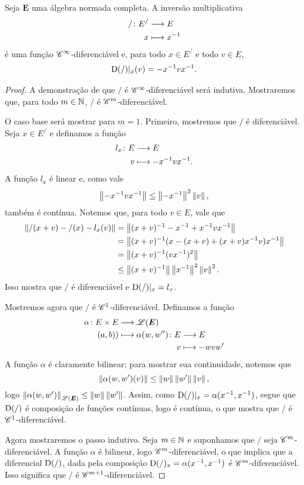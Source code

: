 \begin{proposition}
Seja $\bm E$ uma álgebra normada completa. A inversão multiplicativa
	\begin{align*}
	{/}\colon {E^{/}} &\longrightarrow {E} \\{x} &\longmapsto x^{-1}
	\end{align*}
é uma função $\mathscr{C}^\infty$-diferenciável e, para todo $x \in E^{/}$ e todo $v \in E$,
	\begin{align*}
	\mathrm{D}(/)|_x(v) = -x^{-1} v x^{-1}.
	\end{align*}
\end{proposition}
\begin{proof}
A demonstração de que $/$ é $\mathscr{C}^\infty$-diferenciável será indutiva. Mostraremos que, para todo $m \in \mathbb{N}$, $/$ é $\mathscr{C}^m$-diferenciável.

O caso base será mostrar para $m=1$. Primeiro, mostremos que $/$ é diferenciável. Seja $x \in E^{/}$ e definamos a função
	\begin{align*}
	{l_x}\colon {E} &\longrightarrow {E} \\{v} &\longmapsto -x^{-1} v x^{-1}.
	\end{align*}
A função $l_x$ é linear e, como vale
	\begin{equation}
	\left\Vert{-x^{-1}v x^{-1}}\right\Vert \leq \left\Vert{-x^{-1}}\right\Vert^2 \left\Vert{v}\right\Vert,
	\end{equation}
também é contínua. Notemos que, para todo $v \in E$, vale que
	\begin{align*}
	\left\Vert{/(x+v) - /(x) - l_x(v)}\right\Vert &= \left\Vert{(x+v)^{-1}- x^{-1}+ x^{-1}v x^{-1}}\right\Vert \\
		&= \left\Vert{(x+v)^{-1}(x-(x+v)+(x+v)x^{-1}v )x^{-1}}\right\Vert \\
		&=\left\Vert{(x+v)^{-1}(vx^{-1})^2}\right\Vert \\
		&\leq \left\Vert{(x+v)^{-1}}\right\Vert \left\Vert{x^{-1}}\right\Vert^2 \left\Vert{v}\right\Vert^2.
	\end{align*}
Isso mostra que $/$ é diferenciável e $\mathrm{D}(/)|_x = l_x$.

Mostremos agora que $/$ é $\mathscr{C}^1$-diferenciável. Definamos a função
	\begin{align*}
	\func{\alpha}{E \times E}{\toplin(\bm E)}{(a,b))}{
		\begin{aligned}[t]
			\func{\alpha(w,w'')}{E}{E}{v}{-wvw'}
		\end{aligned}
		}
	\end{align*}
A função $\alpha$ é claramente bilinear; para mostrar sua continuidade, notemos que
	\begin{equation*}
	\left\Vert{\alpha(w,w')(v)}\right\Vert \leq \left\Vert{w}\right\Vert\left\Vert{w'}\right\Vert\left\Vert{v}\right\Vert,
	\end{equation*}
logo $\left\Vert{\alpha(w,w')}\right\Vert_{\mathscr{L}(\bm E)} \leq \left\Vert{w}\right\Vert\left\Vert{w'}\right\Vert$. Assim, como $\mathrm{D}(/)|_x = \alpha(x^{-1},x^{-1})$, segue que $\mathrm{D}(/)$ é composição de funções contínuas, logo é contínua, o que mostra que $/$ é $\mathscr{C}^1$-diferenciável.

Agora mostraremos o passo indutivo. Seja $m \in \mathbb{N}$ e suponhamos que $/$ seja $\mathscr{C}^m$-diferenciável. A função $\alpha$ é bilinear, logo $\mathscr{C}^m$-diferenciável, o que implica que a diferencial $\mathrm{D}(/)$, dada pela composição $\mathrm{D}(/)_x = \alpha(x^{-1}, x^{-1})$ é $\mathscr{C}^m$-diferenciável. Isso significa que $/$ é $\mathscr{C}^{m+1}$-diferenciável.
\end{proof}

